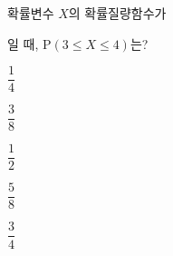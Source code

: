 확률변수 $X$의 확률질량함수가\par\smallskip{}\par\smallskip\noindent 일 때, $\mathrm{P}(3\le X\le 4)$는?
\begin{choicesii}{\rule[-3ex]{0pt}{8ex}$\dfrac{1}{4}$}{\rule[-3ex]{0pt}{8ex}$\dfrac{3}{8}$}{\rule[-3ex]{0pt}{8ex}$\dfrac{1}{2}$}{\rule[-3ex]{0pt}{8ex}$\dfrac{5}{8}$}{\rule[-3ex]{0pt}{8ex}$\dfrac{3}{4}$}\end{choicesii}
